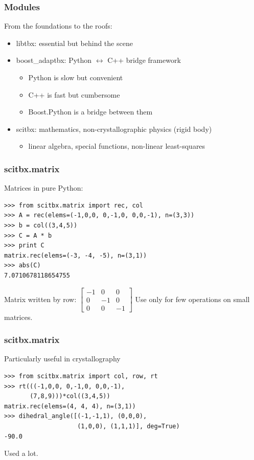 \documentclass[10pt]{beamer}
\begin{document}
\begin{frame}[fragile]
\frametitle{Modules}
From the foundations to the roofs:
\begin{itemize}
\item libtbx: essential but behind the scene
\item boost\_adaptbx: Python $\leftrightarrow$ C++ bridge framework
\begin{itemize}
\item Python is slow but convenient
\item C++ is fast but cumbersome
\item Boost.Python is a bridge between them
\end{itemize}

\item scitbx: mathematics, non-crystallographic physics (rigid body)
\begin{itemize}
\item linear algebra, special functions, non-linear least-squares
\end{itemize}
\end{itemize}
\end{frame}

\begin{frame}[fragile]
\frametitle{scitbx.matrix}
Matrices in pure Python:
\begin{verbatim}
>>> from scitbx.matrix import rec, col
>>> A = rec(elems=(-1,0,0, 0,-1,0, 0,0,-1), n=(3,3))
>>> b = col((3,4,5))
>>> C = A * b
>>> print C
matrix.rec(elems=(-3, -4, -5), n=(3,1))
>>> abs(C)
7.0710678118654755
\end{verbatim}
Matrix written by row: $\begin{bmatrix} -1 & 0 & 0 \\ 0 & -1 & 0 \\ 0 & 0 & -1 \end{bmatrix}$
Use only for few operations on small matrices.
\end{frame}

\begin{frame}[fragile]
\frametitle{scitbx.matrix}
Particularly useful in crystallography
\begin{verbatim}
>>> from scitbx.matrix import col, row, rt
>>> rt(((-1,0,0, 0,-1,0, 0,0,-1),
       (7,8,9)))*col((3,4,5))
matrix.rec(elems=(4, 4, 4), n=(3,1))
>>> dihedral_angle([(-1,-1,1), (0,0,0), 
                    (1,0,0), (1,1,1)], deg=True)
-90.0
\end{verbatim}
Used a lot.
\end{frame}
\end{document}
